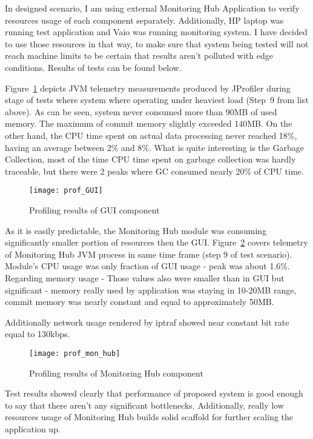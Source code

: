 In designed scenario, I am using external Monitoring Hub Application to verify resources usage of each component separately. Additionally, HP laptop was running test application and Vaio was running monitoring system. I have decided to use those resources in that way, to make sure that system being tested will not reach machine limits to be certain that results aren\rq{}t polluted with edge conditions. Results of tests can be found below.


Figure~\ref{fig:prof_GUI} depicts JVM telemetry measurements produced by JProfiler during stage of tests where system where operating under heaviest load (Step~9 from list above). As can be seen, system never consumed more than 90MB of used memory. The maximum of commit memory slightly exceeded 140MB. On the other hand, the CPU time spent on actual data processing never reached 18\%, having an average between 2\% and 8\%. What is quite interesting is the Garbage Collection, most of the time CPU time spent on garbage collection was hardly traceable, but there were 2 peaks where GC consumed nearly 20\% of CPU time. 

\begin{figure}[ht]
\centering
\texttt{[image: prof\_GUI]}
\caption{Profiling results of GUI component}
\label{fig:prof_GUI}
\end{figure}


As it is easily predictable, the Monitoring Hub module was consuming significantly smaller portion of resources then the GUI. Figure~\ref{fig:prof_mon_hub} covers telemetry of Monitoring Hub JVM process in same time frame (step 9 of test scenario). Module\rq{}s CPU usage was only fraction of GUI usage - peak was about 1.6\%. Regarding memory usage - Those values also were smaller than in GUI but significant - memory really used by application was staying in 10-20MB range, commit memory was nearly constant and equal to approximately 50MB.

Additionally network usage rendered by iptraf showed near constant bit rate equal to 130kbps.

\begin{figure}[ht]
\centering
\texttt{[image: prof\_mon\_hub]}
\caption{Profiling results of Monitoring Hub component}
\label{fig:prof_mon_hub}
\end{figure}

Test results showed clearly that performance of proposed system is good enough to say that there aren\rq{}t any significant bottlenecks. Additionally, really low resources usage of Monitoring Hub builds solid scaffold for further scaling the application up.

